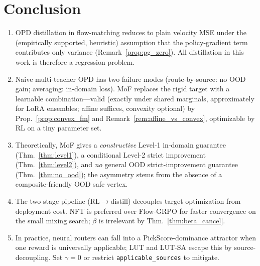 \documentclass[11pt,a4paper]{article}
\theoremstyle{definition}
\begin{document}
\section{Conclusion}
\label{sec:conclusion}

\begin{tcolorbox}[colback=yellow!5,colframe=yellow!60!black,title=Summary]
\begin{enumerate}[leftmargin=1.5em]
\item OPD distillation in flow-matching reduces to plain velocity MSE
under the (empirically supported, heuristic) assumption that the
policy-gradient term contributes only variance
(Remark~\ref{prop:pg_zero}). All distillation in this work is therefore
a regression problem.
\item Naive multi-teacher OPD has two failure modes (route-by-source:
no OOD gain; averaging: in-domain loss). MoF replaces the rigid
target with a learnable combination---valid (exactly under shared
marginals, approximately for LoRA ensembles; affine suffices, convexity
optional) by Prop.~\ref{prop:convex_fm} and
Remark~\ref{rem:affine_vs_convex}, optimizable by RL on a tiny
parameter set.
\item Theoretically, MoF gives a \emph{constructive} Level-1 in-domain
guarantee (Thm.~\ref{thm:level1}), a conditional Level-2 strict
improvement (Thm.~\ref{thm:level2}), and \emph{no} general OOD
strict-improvement guarantee (Thm.~\ref{thm:no_ood}); the asymmetry
stems from the absence of a composite-friendly OOD safe vertex.
\item The two-stage pipeline (RL$\to$distill) decouples target
optimization from deployment cost. NFT is preferred over Flow-GRPO for
faster convergence on the small mixing search; $\beta$ is irrelevant by
Thm.~\ref{thm:beta_cancel}.
\item In practice, neural routers can fall into a PickScore-dominance
attractor when one reward is universally applicable; LUT and LUT-SA
escape this by source-decoupling. Set $\gamma=0$ or restrict
\texttt{applicable\_sources} to mitigate.
\end{enumerate}
\end{tcolorbox}
\end{document}
